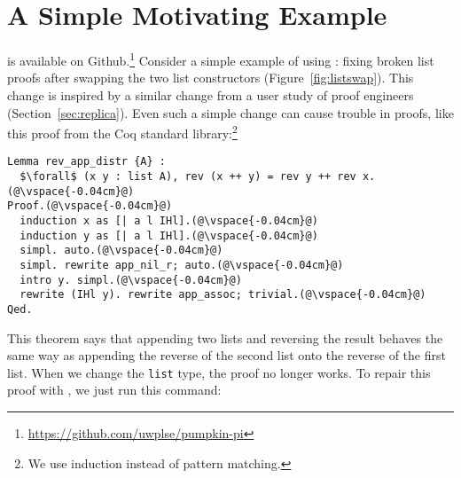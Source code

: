 \section{A Simple Motivating Example}
\label{sec:overview}

\begin{figure*}
\begin{minipage}{0.46\textwidth}
   
\end{minipage}
\hfill
\begin{minipage}{0.46\textwidth}
   
\end{minipage}
\vspace{-0.3cm}
\caption{The updated \lstinline{list} (right) is the old \lstinline{list} (left) with its two constructors swapped ().}
\label{fig:listswap}
\end{figure*}

\toolname is available on Github.\footnote{\url{https://github.com/uwplse/pumpkin-pi}}
Consider a simple example of using \toolname: fixing broken list proofs after swapping the two list constructors (Figure~\ref{fig:listswap}).
This change is inspired by a similar change from a user study of proof engineers (Section~\ref{sec:replica}).
Even such a simple change can cause trouble in proofs, like this proof from the Coq standard library:\footnote{We use induction instead of pattern matching.}

\begin{lstlisting}
Lemma rev_app_distr {A} :
  $\forall$ (x y : list A), rev (x ++ y) = rev y ++ rev x.(@\vspace{-0.04cm}@)
Proof.(@\vspace{-0.04cm}@)
  induction x as [| a l IHl].(@\vspace{-0.04cm}@)
  induction y as [| a l IHl].(@\vspace{-0.04cm}@)
  simpl. auto.(@\vspace{-0.04cm}@)
  simpl. rewrite app_nil_r; auto.(@\vspace{-0.04cm}@)
  intro y. simpl.(@\vspace{-0.04cm}@)
  rewrite (IHl y). rewrite app_assoc; trivial.(@\vspace{-0.04cm}@)
Qed.
\end{lstlisting}
This theorem says that appending two lists and reversing the result behaves the same way as appending
the reverse of the second list onto the reverse of the first list.
When we change the \lstinline{list} type, the proof no longer works.
To repair this proof with \toolname, we just run this command:

